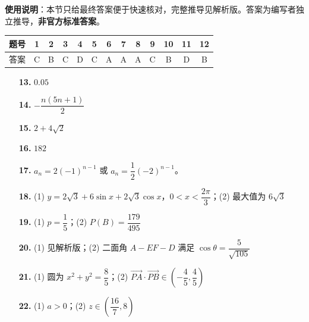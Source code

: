 
\begin{gknotice}
\textbf{使用说明}：本节只给最终答案便于快速核对，完整推导见解析版。答案为编写者独立推导，\textbf{非官方标准答案}。
\end{gknotice}

\begin{center}\begin{tabular}{ccccccccccccc}
\toprule
题号 & 1 & 2 & 3 & 4 & 5 & 6 & 7 & 8 & 9 & 10 & 11 & 12 \\
\midrule
答案 & C & B & C & D & C & A & A & A & C & B & D & B \\
\bottomrule
\end{tabular}\end{center}

\begin{itemize}[leftmargin=2.6em]
  \item[\textbf{13.}] $0.05$
  \item[\textbf{14.}] $-\dfrac{n(5n+1)}2$
  \item[\textbf{15.}] $2+4\sqrt2$
  \item[\textbf{16.}] $182$
\end{itemize}

\begin{itemize}[leftmargin=2.6em]
  \item[\textbf{17.}] $a_n=2(-1)^{n-1}$ 或 $a_n=\dfrac12(-2)^{n-1}$。
  \item[\textbf{18.}] (1) $y=2\sqrt3+6\sin x+2\sqrt3\cos x$，$0<x<\dfrac{2\pi}3$；(2) 最大值为 $6\sqrt3$
  \item[\textbf{19.}] (1) $p=\dfrac15$；(2) $P(B)=\dfrac{179}{495}$
  \item[\textbf{20.}] (1) 见解析版；(2) 二面角 $A-EF-D$ 满足 $\cos\theta=\dfrac5{\sqrt{105}}$
  \item[\textbf{21.}] (1) 圆为 $x^2+y^2=\dfrac85$；(2) $\overrightarrow{PA}\cdot\overrightarrow{PB}\in\left(-\dfrac45,\dfrac45\right)$
  \item[\textbf{22.}] (1) $a>0$；(2) $z\in\left(\dfrac{16}{7},8\right)$
\end{itemize}

